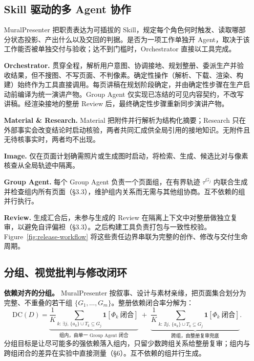 \subsection{Skill 驱动的多 Agent 协作}

MuralPresenter 把职责表达为可插拔的 Skill，规定每个角色何时触发、读取哪部分状态投影、产出什么以及交回的判据。是否为一项工作单独开 Agent，取决于该工作能否被单独交付与验收；达不到门槛时，Orchestrator 直接以工具完成。

\textbf{Orchestrator.} 贯穿全程，解析用户意图、协调接地、规划整册、委派生产并验收结果，但不搜图、不写页面、不判像素。确定性操作（解析、下载、渲染、构建）始终作为工具直接调用。每页讲稿在规划阶段确定，并由确定性步骤在生产启动前编译为统一演讲产物。Group Agent 仅实现已冻结的可见内容契约，不改写讲稿。经渲染接地的整册 Review 后，最终确定性步骤重新同步演讲产物。

\textbf{Material \& Research.} Material 把附件并行解析为结构化摘要；Research 只在外部事实会改变结论时启动核验，两者共同汇成供全局引用的接地知识。无附件且无待核事实时，两者均不出现。

\textbf{Image.} 仅在页面计划确需照片或生成图时启动，将检索、生成、候选比对与像素核查从全局轨迹中隔离。

\textbf{Group Agent.} 每个 Group Agent 负责一个页面组，在有界轨迹 \(\tau^{G_j}\) 内联合生成并检查组内所有页面（§3.3），维护组内关系而无需与其他组协商。互不依赖的组并行执行。

\textbf{Review.} 生成汇合后，未参与生成的 Review 在隔离上下文中对整册做独立复审，以避免自评偏袒（§3.3）。之后构建工具负责打包与一致性校验。Figure~\ref{fig:release-workflow} 将这些责任边界串联为完整的创作、修改与交付生命周期。



\subsection{分组、视觉批判与修改闭环}

\textbf{依赖对齐的分组。} MuralPresenter 按叙事、设计与素材亲缘，把页面集合划分为完整、不重叠的若干组 \(\{G_1,\ldots,G_m\}\)。整册依赖闭合率分解为： \[
\mathrm{DC}(D)=\underbrace{\frac{1}{K}\!\!\sum_{k:\,\exists j,\,\{a_k\}\cup T_k\subseteq G_j}\!\!\mathbf{1}[\Phi_k\ \text{闭合}]}_{\text{组内，由单一 Group Agent 闭合}}
\;+\;
\underbrace{\frac{1}{K}\!\!\sum_{k:\,\nexists j,\,\{a_k\}\cup T_k\subseteq G_j}\!\!\mathbf{1}[\Phi_k\ \text{闭合}]}_{\text{跨组，由整册复审兜底}}.
\] 分组目标是让尽可能多的强依赖落入组内，只留少数跨组关系给整册复审；组内与跨组闭合的差异在实验中直接测量（§6）。互不依赖的组并行生成。

